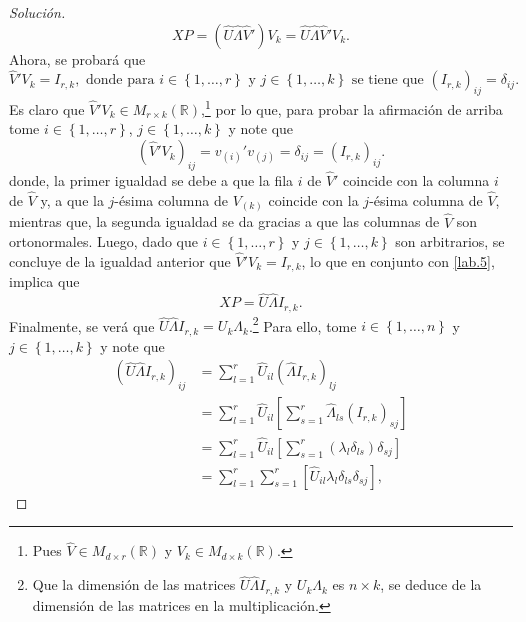 \documentclass[10.5pt,notitlepage]{article}
\newenvironment{solucion}
  {\begin{proof}[Solución]}
  {\end{proof}}
\newcommand{\RR}{\mathbb{R}}
\newcommand{\corch}[1]{\left[ #1 \right]}
\newcommand{\kis}[1]{\left\{ #1 \right\}}
\theoremstyle{plain}
\begin{document}
\begin{solucion}
\begin{equation}\label{lab.5}
    XP = (\hat{U}\hat{\Lambda}\hat{V}') V_{k} = \hat{U}\hat{\Lambda}\hat{V}'V_{k}.
\end{equation}
Ahora, se probará que 
\begin{equation}\label{lab.-1}
\hat{V}'V_{k} = I_{r,k}, \text{ donde para } i \in \kis{1,\hdots,r} \text{ y }  j \in \kis{1,\hdots,k} \text{ se tiene que } (I_{r,k})_{ij} =  \delta_{ij}.   
\end{equation}
Es claro que \(\hat{V}'V_{k} \in M_{r \times k}(\RR)\),\footnote{Pues \(\hat{V} \in M_{d \times r}(\RR)\) y \(V_{k}\in M_{d \times k}(\RR)\).} por lo que, para probar la afirmación de arriba tome \(i \in \kis{1, \hdots, r}\), \(j \in \kis{1, \hdots, k}\) y note que 
\begin{equation*}
(\hat{V}'V_{k})_{ij} = v_{(i)}'v_{(j)} = \delta_{ij} = ( I_{r,k})_{ij}.    
\end{equation*}
donde, la primer igualdad se debe a que la fila \(i\) de \(\hat{V}'\) coincide con la columna \(i\) de \(\hat{V}\) y, a que la \(j\)-ésima columna de \(V_{(k)}\) coincide con la \(j\)-ésima columna de \(\hat{V}\), mientras que, la segunda igualdad se da gracias a que las columnas de \(\hat{V}\) son ortonormales. Luego, dado que \(i \in \kis{1, \hdots, r}\) y \(j \in \kis{1, \hdots, k}\) son arbitrarios, se concluye de la igualdad anterior que \(\hat{V}'V_{k} =  I_{r,k}\), lo que en conjunto con \eqref{lab.5}, implica que 
\begin{equation}\label{lab.6}
    XP = \hat{U}\hat{\Lambda}I_{r,k}.
\end{equation}
Finalmente, se verá que \(\hat{U}\hat{\Lambda}I_{r,k} = U_{k}\Lambda_{k}\).\footnote{Que la dimensión de las matrices \(\hat{U}\hat{\Lambda}I_{r,k}\) y \(U_{k}\Lambda_{k}\) es \(n \times k\), se deduce de la dimensión de las matrices en la multiplicación.} Para ello, tome \(i \in \kis{1, \hdots, n}\) y \(j \in \kis{1, \hdots,k}\) y note que \begin{align*}
    ( \hat{U}\hat{\Lambda}I_{r,k})_{ij} &= \sum_{l = 1}^{r}\hat{U}_{il}(\hat{\Lambda}I_{r,k})_{lj}\\ 
                                                  &= \sum_{l = 1}^{r}\hat{U}_{il}\corch{\sum_{s = 1}^{r}\hat{\Lambda}_{ls}(I_{r,k})_{sj}}\\ 
                                                  &= \sum_{l = 1}^{r}\hat{U}_{il}\corch{\sum_{s = 1}^{r}(\lambda_{l}\delta_{ls})\delta_{sj}}\\
                                                  &=  \sum_{l = 1}^{r}\sum_{s = 1}^{r}\corch{\hat{U}_{il}\lambda_{l}\delta_{ls}\delta_{sj}},

\end{align*}
\end{solucion}
\end{document}
